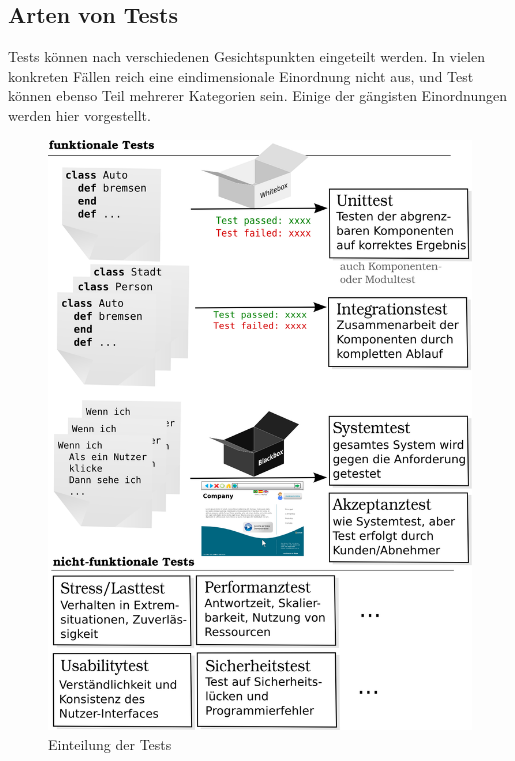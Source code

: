 
\subsection{Arten von Tests}
Tests können nach verschiedenen Gesichtspunkten eingeteilt werden. In vielen konkreten Fällen reich eine eindimensionale Einordnung nicht aus, und Test können ebenso Teil mehrerer Kategorien sein. Einige der gängisten Einordnungen werden hier vorgestellt.
\begin{figure}[hp]
 \centering
 \includegraphics[width=\textwidth]{./diagrams/testarten.png}
 \caption{Einteilung der Tests}
 \label{fig:testArten}
\end{figure}

